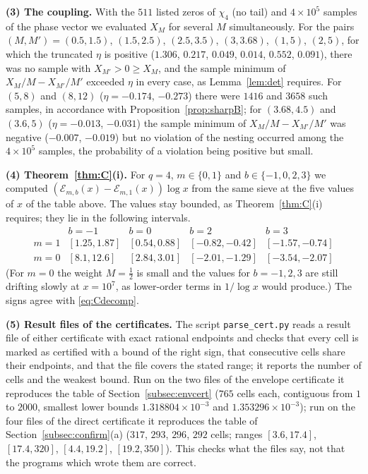 \documentclass[11pt]{amsart}
\theoremstyle{definition}
\numberwithin{equation}{section}
\newcommand{\cE}{\mathcal E}
\begin{document}
\medskip\noindent\textbf{(3) The coupling.} With the $511$ listed
zeros of $\chi_4$ (no tail) and $4\times10^5$ samples of the phase
vector we evaluated $X_M$ for several $M$ simultaneously. For the
pairs $(M,M')=(0.5,1.5)$, $(1.5,2.5)$, $(2.5,3.5)$, $(3,3.68)$,
$(1,5)$, $(2,5)$, for which the truncated $\eta$ is positive
($1.306$, $0.217$, $0.049$, $0.014$, $0.552$, $0.091$), there was no
sample with $X_{M'}>0\ge X_M$, and the sample minimum of
$X_M/M-X_{M'}/M'$ exceeded $\eta$ in every case, as
Lemma~\ref{lem:det} requires. For $(5,8)$ and $(8,12)$
($\eta=-0.174$, $-0.273$) there were $1416$ and $3658$ such samples,
in accordance with Proposition~\ref{prop:sharpB}; for $(3.68,4.5)$
and $(3.6,5)$ ($\eta=-0.013$, $-0.031$) the sample minimum of
$X_M/M-X_{M'}/M'$ was negative ($-0.007$, $-0.019$) but no violation
of the nesting occurred among the $4\times10^5$ samples, the
probability of a violation being positive but small.

\medskip\noindent\textbf{(4) Theorem~\ref{thm:C}(i).} For $q=4$,
$m\in\{0,1\}$ and $b\in\{-1,0,2,3\}$ we computed
$(\cE_{m,b}(x)-\cE_{m,1}(x))\log x$ from the same sieve at the five
values of $x$ of the table above. The values stay bounded, as
Theorem~\ref{thm:C}(i) requires; they lie in the following intervals.
\[
\begin{array}{c|cccc}
 & b=-1 & b=0 & b=2 & b=3\\\hline
m=1 & [1.25,1.87] & [0.54,0.88] & [-0.82,-0.42] & [-1.57,-0.74]\\
m=0 & [8.1,12.6] & [2.84,3.01] & [-2.01,-1.29] & [-3.54,-2.07]
\end{array}
\]
(For $m=0$ the weight $M=\tfrac12$ is small and the values for
$b=-1,2,3$ are still drifting slowly at $x=10^7$, as lower-order
terms in $1/\log x$ would produce.) The signs agree with
\eqref{eq:Cdecomp}.

\medskip\noindent\textbf{(5) Result files of the certificates.} The
script \texttt{parse\_cert.py} reads a result file of either
certificate with exact rational endpoints and checks that every cell
is marked as certified with a bound of the right sign, that
consecutive cells share their endpoints, and that the file covers the
stated range; it reports the number of cells and the weakest bound.
Run on the two files of the envelope certificate it reproduces the
table of Section~\ref{subsec:envcert} ($765$ cells each, contiguous
from $1$ to $2000$, smallest lower bounds $1.318804\times10^{-3}$ and
$1.353296\times10^{-3}$); run on the four files of the direct
certificate it reproduces the table of
Section~\ref{subsec:confirm}(a) ($317$, $293$, $296$, $292$ cells;
ranges $[3.6,17.4]$, $[17.4,320]$, $[4.4,19.2]$, $[19.2,350]$). This
checks what the files say, not that the programs which wrote them are
correct.
\end{document}
